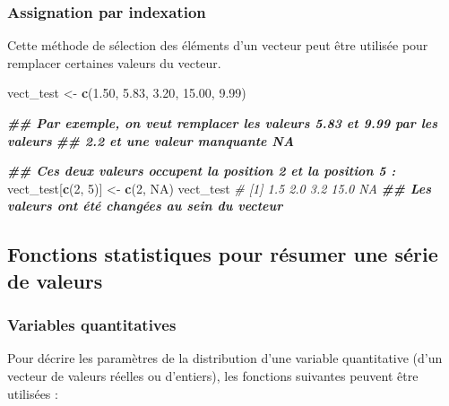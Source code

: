 \documentclass[
]{book}
\newenvironment{Shaded}{\begin{snugshade}}{\end{snugshade}}
\newcommand{\CommentTok}[1]{\textcolor[rgb]{0.56,0.35,0.01}{\textit{#1}}}
\newcommand{\ConstantTok}[1]{\textcolor[rgb]{0.56,0.35,0.01}{#1}}
\newcommand{\DecValTok}[1]{\textcolor[rgb]{0.00,0.00,0.81}{#1}}
\newcommand{\DocumentationTok}[1]{\textcolor[rgb]{0.56,0.35,0.01}{\textbf{\textit{#1}}}}
\newcommand{\FloatTok}[1]{\textcolor[rgb]{0.00,0.00,0.81}{#1}}
\newcommand{\FunctionTok}[1]{\textcolor[rgb]{0.13,0.29,0.53}{\textbf{#1}}}
\newcommand{\NormalTok}[1]{#1}
\newcommand{\OtherTok}[1]{\textcolor[rgb]{0.56,0.35,0.01}{#1}}
\begin{document}
\subsubsection{Assignation par indexation}\label{assignation-par-indexation}

Cette méthode de sélection des éléments d'un vecteur peut être utilisée pour remplacer certaines valeurs du vecteur.

\begin{Shaded}
\begin{Highlighting}[]
\NormalTok{vect\_test }\OtherTok{\textless{}{-}} \FunctionTok{c}\NormalTok{(}\FloatTok{1.50}\NormalTok{, }\FloatTok{5.83}\NormalTok{, }\FloatTok{3.20}\NormalTok{, }\FloatTok{15.00}\NormalTok{, }\FloatTok{9.99}\NormalTok{)}

\DocumentationTok{\#\# Par exemple, on veut remplacer les valeurs 5.83 et 9.99 par les valeurs}
\DocumentationTok{\#\# 2.2 et une valeur manquante NA}

\DocumentationTok{\#\# Ces deux valeurs occupent la position 2 et la position 5 :}
\NormalTok{vect\_test[}\FunctionTok{c}\NormalTok{(}\DecValTok{2}\NormalTok{, }\DecValTok{5}\NormalTok{)] }\OtherTok{\textless{}{-}} \FunctionTok{c}\NormalTok{(}\DecValTok{2}\NormalTok{, }\ConstantTok{NA}\NormalTok{)}
\NormalTok{vect\_test}
\CommentTok{\# [1]  1.5  2.0  3.2 15.0   NA}
\DocumentationTok{\#\# Les valeurs ont été changées au sein du vecteur}
\end{Highlighting}
\end{Shaded}

\subsection{Fonctions statistiques pour résumer une série de valeurs}\label{fonctions-statistiques-pour-ruxe9sumer-une-suxe9rie-de-valeurs}

\subsubsection{Variables quantitatives}\label{variables-quantitatives}

Pour décrire les paramètres de la distribution d'une variable quantitative (d'un vecteur de valeurs réelles ou d'entiers), les fonctions suivantes peuvent être utilisées :
\end{document}
